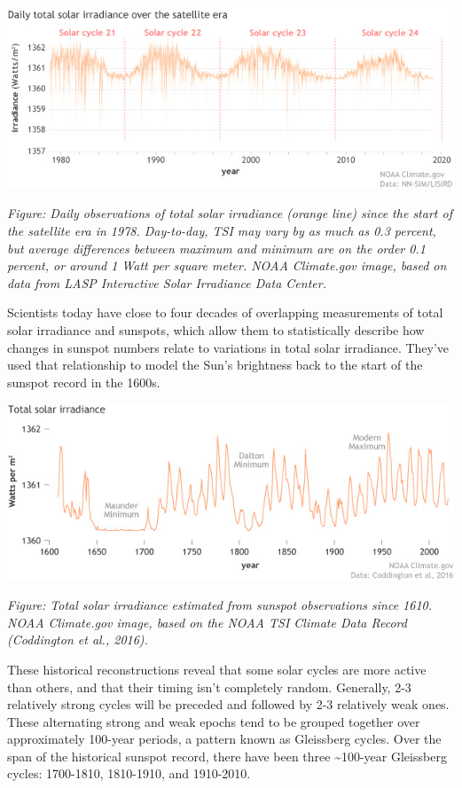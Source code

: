 \documentclass[
]{book}
\begin{document}
\includegraphics{fig/nn_sim_tsi_satelliteera.jpg}

\emph{Figure: Daily observations of total solar irradiance (orange line) since the start of the satellite era in 1978. Day-to-day, TSI may vary by as much as 0.3 percent, but average differences between maximum and minimum are on the order 0.1 percent, or around 1 Watt per square meter. NOAA Climate.gov image, based on data from LASP Interactive Solar Irradiance Data Center.}

Scientists today have close to four decades of overlapping measurements of total solar irradiance and sunspots, which allow them to statistically describe how changes in sunspot numbers relate to variations in total solar irradiance. They've used that relationship to model the Sun's brightness back to the start of the sunspot record in the 1600s.

\includegraphics{fig/TSI_1610-2020.jpg}

\emph{Figure: Total solar irradiance estimated from sunspot observations since 1610. NOAA Climate.gov image, based on the NOAA TSI Climate Data Record (Coddington et al., 2016).}

These historical reconstructions reveal that some solar cycles are more active than others, and that their timing isn't completely random. Generally, 2-3 relatively strong cycles will be preceded and followed by 2-3 relatively weak ones. These alternating strong and weak epochs tend to be grouped together over approximately 100-year periods, a pattern known as Gleissberg cycles. Over the span of the historical sunspot record, there have been three \textasciitilde100-year Gleissberg cycles: 1700-1810, 1810-1910, and 1910-2010.
\end{document}

